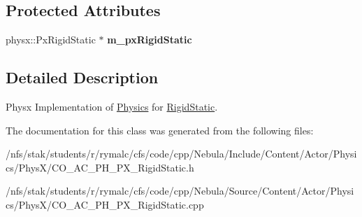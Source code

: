 \subsection*{Protected Attributes}
\begin{DoxyCompactItemize}
\item 
\hypertarget{classContent_1_1Actor_1_1Physics_1_1PhysX_1_1RigidStatic_ac693c686b158d54c9d881aee4cb46a07}{
physx::PxRigidStatic $\ast$ {\bfseries m\_\-pxRigidStatic}}
\label{classContent_1_1Actor_1_1Physics_1_1PhysX_1_1RigidStatic_ac693c686b158d54c9d881aee4cb46a07}

\end{DoxyCompactItemize}


\subsection{Detailed Description}
Physx Implementation of \hyperlink{namespaceContent_1_1Actor_1_1Physics}{Physics} for \hyperlink{classContent_1_1Actor_1_1Physics_1_1PhysX_1_1RigidStatic}{RigidStatic}. 

The documentation for this class was generated from the following files:\begin{DoxyCompactItemize}
\item 
/nfs/stak/students/r/rymalc/cfs/code/cpp/Nebula/Include/Content/Actor/Physics/PhysX/CO\_\-AC\_\-PH\_\-PX\_\-RigidStatic.h\item 
/nfs/stak/students/r/rymalc/cfs/code/cpp/Nebula/Source/Content/Actor/Physics/PhysX/CO\_\-AC\_\-PH\_\-PX\_\-RigidStatic.cpp\end{DoxyCompactItemize}
